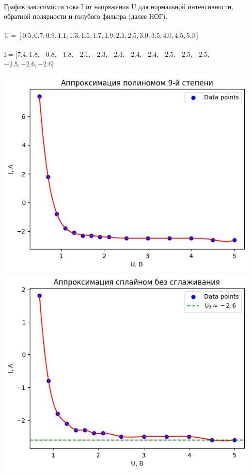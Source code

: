 \documentclass[12pt,openany]{book}
\begin{document}
\newpage

\noindent График зависимости тока I от напряжения U для нормальной интенсивности, 
обратной полярности и голубого фильтра (далее НОГ).\\\\
$\text{U} = [0.5, 0.7, 0.9, 1.1, 1.3, 1.5, 1.7, 1.9, 2.1, 2.5, 3.0, 3.5, 4.0, 4.5, 5.0]$\\\\
$\text{I} = [7.4, 1.8, -0.8, -1.8, -2.1, -2.3, -2.3, -2.4, -2.4, -2.5, -2.5, -2.5,$
$-2.5, -2.6, -2.6]$\\ 

\begin{center}
    \includegraphics[scale=0.59]{5} \\

    \includegraphics[scale=0.59]{6} \\
\end{center}
\end{document}
